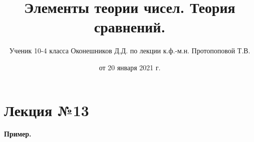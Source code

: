 \documentclass{article}
\begin{document}

    \title{Элементы теории чисел. Теория сравнений.}
    \author{Ученик 10-4 класса Оконешников Д.Д. по лекции к.ф.-м.н. Протопоповой Т.В.}
    \date{от 20 января 2021 г.}
    \maketitle

    \section{Лекция №13}
    \textbf{Пример.} 
\end{document}
